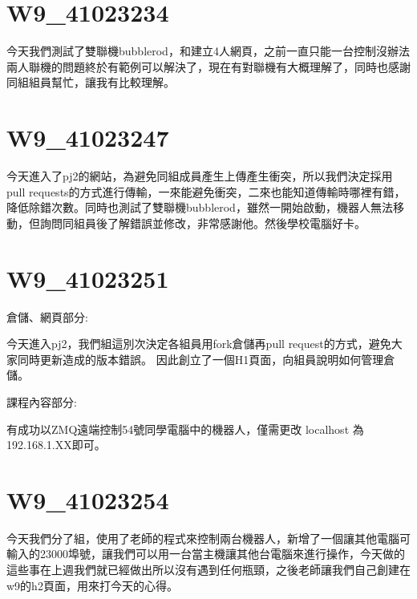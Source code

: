 \documentclass{article}
\begin{document}
\section{W9\_41023234}

今天我們測試了雙聯機bubblerod，和建立4人網頁，之前一直只能一台控制沒辦法兩人聯機的問題終於有範例可以解決了，現在有對聯機有大概理解了，同時也感謝同組組員幫忙，讓我有比較理解。

\section{W9\_41023247}

今天進入了pj2的網站，為避免同組成員產生上傳產生衝突，所以我們決定採用pull requests的方式進行傳輸，一來能避免衝突，二來也能知道傳輸時哪裡有錯，降低除錯次數。同時也測試了雙聯機bubblerod，雖然一開始啟動，機器人無法移動，但詢問同組員後了解錯誤並修改，非常感謝他。然後學校電腦好卡。

\section{W9\_41023251}

倉儲、網頁部分:

今天進入pj2，我們組這別次決定各組員用fork倉儲再pull request的方式，避免大家同時更新造成的版本錯誤。
因此創立了一個H1頁面，向組員說明如何管理倉儲。


課程內容部分:

有成功以ZMQ遠端控制54號同學電腦中的機器人，僅需更改 localhost 為192.168.1.XX即可。

\section{W9\_41023254}

今天我們分了組，使用了老師的程式來控制兩台機器人，新增了一個讓其他電腦可輸入的23000埠號，讓我們可以用一台當主機讓其他台電腦來進行操作，今天做的這些事在上週我們就已經做出所以沒有遇到任何瓶頸，之後老師讓我們自己創建在w9的h2頁面，用來打今天的心得。
\end{document}
